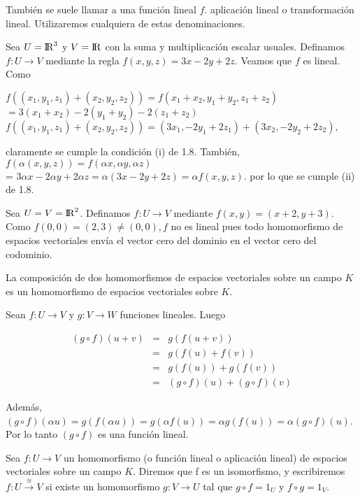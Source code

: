 				También se suele llamar a una función lineal $ f $. aplicación lineal o transformación lineal. Utilizaremos cualquiera de estas denominaciones.
				
				
				\begin{ejem} Sea $ U = {\rm I\!R}^{3} $ y $ V = {\rm I\!R} $ con la suma y multiplicación escalar usuales. Definamos $ f:U \rightarrow V $  mediante la regla $ f(x, y, z) = 3x - 2y + 2z $. Veamos que $ f $ es lineal. Como
				
			$f((x_{1}, y_{1}, z_{1})+(x_{2}, y_{2}, z_{2})) =  f(x_{1}+x_{2}, y_{1}+y_{2}, z_{1}+z_{2}) $ $= 3(x_{1}+x_{2}) -2(y_{1}+y_{2}) -2(z_{1}+z_{2})$
			$f((x_{1}, y_{1}, z_{1})+(x_{2}, y_{2}, z_{2}))  =  (3x_{1}, -2y_{1}+2z_{1})+(3x_{2}, -2y_{2}+2z_{2}),$
				
				\setlength{\parindent}{0in}%
				claramente se cumple la condición (i) de 1.8. También, $ f(\alpha(x, y, z)) = f(\alpha x, \alpha y, \alpha z)$\\
				= $ 3 \alpha x -2 \alpha y +2 \alpha z = \alpha(3x-2y+2z) = \alpha f(x,y,z)$. por lo que se cumple (ii) de 1.8. 
				\end{ejem}
				\begin{ejem} Sea $ U = V = {\rm I\!R}^{2} $. Definamos $ f:U \rightarrow V $ mediante $ f(x,y) = (x+2, y+3) $. Como $ f(0,0) = (2,3) \not= (0,0), f$ no es lineal pues todo homomorfismo de espacios vectoriales envía el vector cero del dominio en el vector cero del codominio. \end{ejem}
				
				\begin{pro}
					La composición de dos homomorfismos de espacios vectoriales sobre un campo $ K $ es un homomorfismo de espacios vectoriales sobre $ K $.
				\end{pro}
				
				\begin{demo}
					Sean $ f:U \rightarrow V  $ y $ g:V \rightarrow W $ funciones lineales. Luego
					
					\[ \begin{matrix}
					(g \circ f) (u+v) &=& g(f(u+v))\\
					&=& g(f(u)+f(v))\\
					&=& g(f(u))+g(f(v))\\
					&=& (g \circ f) (u)+(g \circ f) (v)
					\end{matrix} \] 
				\end{demo}
				Además, $ (g \circ f) (\alpha u) = g(f(\alpha u)) = g(\alpha f(u)) = \alpha g(f(u)) = \alpha (g \circ f)(u) $. Por lo tanto $ (g \circ f) $ es una función lineal.
				\begin{defi}
				Sea $ f:U \rightarrow V$ un homomorfismo (o función lineal o aplicación lineal) de espacios vectoriales sobre un campo $ K $. Diremos que f es un isomorfismo, y escribiremos $ f:U \overset{\cong}{\rightarrow} V$ si existe un homomorfismo $ g:V \rightarrow U $ tal que $ g \circ f = 1_{U} $ y $ f \circ g = 1_{V}$.
				\end{defi}
				
